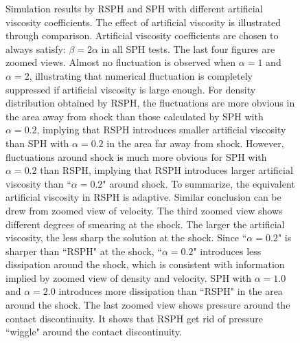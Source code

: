 \begin{figure}
\begin{minipage}{.495\textwidth}
    \end{minipage}%
    \caption{Simulation results by RSPH and SPH with different artificial viscosity coefficients. The effect of artificial viscosity is illustrated through comparison. Artificial viscosity coefficients are chosen to always satisfy: $\beta=2\alpha$ in all SPH tests. The last four figures are zoomed views. Almost no fluctuation is observed when $\alpha=1$ and $\alpha=2$, illustrating that numerical fluctuation is completely suppressed if artificial viscosity is large enough. For density distribution obtained by RSPH, the fluctuations are more obvious in the area away from shock than those calculated by SPH with $\alpha=0.2$, implying that RSPH introduces smaller artificial viscosity than SPH with $\alpha=0.2$ in the area far away from shock. However, fluctuations around shock is much more obvious for SPH with $\alpha=0.2$ than RSPH, implying that RSPH introduces larger artificial viscosity than ``$\alpha=0.2$" around shock. To summarize, the equivalent artificial viscosity in RSPH is adaptive. Similar conclusion can be drew from zoomed view of velocity. The third zoomed view shows different degrees of smearing at the shock. The larger the artificial viscosity, the less sharp the solution at the shock. Since ``$\alpha=0.2$" is sharper than ``RSPH" at the shock, ``$\alpha=0.2$" introduces less dissipation around the shock, which is consistent with information implied by zoomed view of density and velocity. SPH with $\alpha=1.0$ and $\alpha=2.0$ introduces more dissipation than ``RSPH" in the area around the shock. The last zoomed view shows pressure around the contact discontinuity. It shows that RSPH get rid of pressure ``wiggle" around the contact discontinuity.}
    \label{fig:RCM-Sod-SPH-alf}
\end{figure}

